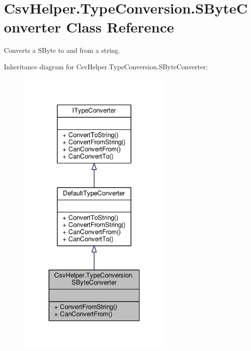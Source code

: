 \hypertarget{a00148}{\section{Csv\-Helper.\-Type\-Conversion.\-S\-Byte\-Converter Class Reference}
\label{a00148}
}


Converts a S\-Byte to and from a string.  




Inheritance diagram for Csv\-Helper.\-Type\-Conversion.\-S\-Byte\-Converter\-:
\nopagebreak
\begin{figure}[H]
\begin{center}
\leavevmode
\includegraphics[width=220pt]{a00542}
\end{center}
\end{figure}


